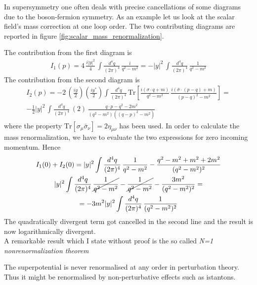 \documentclass[12pt]{article}
\begin{document}
In supersymmetry one often deals with precise cancellations of some diagrams due to the boson-fermion symmetry. As an example let us look at the scalar field's mass correction at one loop order. The two contributing diagrams are reported in figure \ref{fig:scalar_mass_renormalization}.
\raggedright The contribution from the first diagram is
\begin{gather*}
  I_1(p) = 4 \,\frac{i|y|^2}{4} \, \int \frac{d^4 q}{(2\pi)^4} \, \frac{i}{q^2 - m^2} = - |y|^2 \, \int \frac{d^4 q}{(2\pi)^4} \, \frac{1}{q^2 - m^2}
\end{gather*}
The contribution from the second diagram is 
\begin{gather*}
  I_2(p) = - 2 \, \left(\frac{iy}{2}\right)\left(\frac{iy^*}{2}\right) \int \frac{d^4 q}{(2\pi)^4} \, \text{Tr}\left[\frac{i(\sigma \cdot q + m)}{q^2 - m^2} \, \frac{i(\bar\sigma \cdot (p-q) + m)}{(p-q)^2 - m^2}\right] = \\
  - \frac{1}{2} |y|^2 \, \int \frac{d^4 q}{(2\pi)^4} \, (2) \, \frac{q\cdot p - q^2 - 2m^2}{(q^2-m^2) ((q-p)^2-m^2)}
\end{gather*}
where the property $\text{Tr}[\sigma_\mu \bar\sigma_\nu] = 2\eta_{\mu\nu}$ has been used. In order to calculate the mass renormalization, we have to evaluate the two expressions for zero incoming momentum. Hence
\begin{gather*}
  I_1(0) + I_2(0) = |y|^2 \int \frac{d^4q}{(2\pi)^4} \, \frac{1}{q^2-m^2} - \frac{q^2 -m^2 + m^2 + 2m^2}{(q^2-m^2)^2} \\
  |y|^2 \int \frac{d^4q}{(2\pi)^4} \, \cancel{\frac{1}{q^2-m^2}} - \cancel{\frac{1}{q^2-m^2}} - \frac{3m^2}{(q^2-m^2)^2}= \\ 
  = -3m^2|y|^2 \int \frac{d^4q}{(2\pi)^4} \, \frac{1}{(q^2-m^2)^2}
\end{gather*}
The quadratically divergent term got cancelled in the second line and the result is now logarithmically divergent. \\
A remarkable result which I state without proof is the so called \emph{N=1 nonrenormalization theorem}
\begin{center}
  The superpotential is never renormalised at any order in perturbation theory. Thus it might be renormalised by non-perturbative effects such as istantons.
\end{center}

\newpage 
\end{document}
